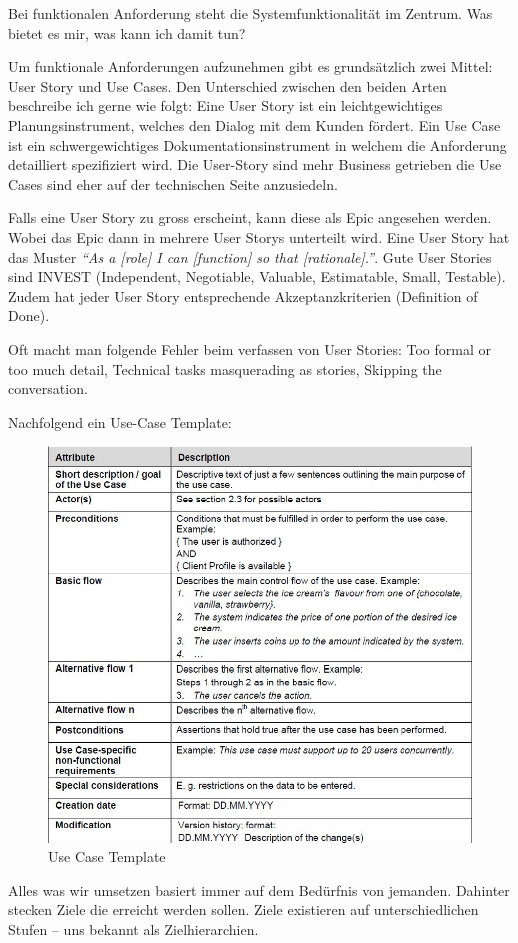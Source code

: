 Bei funktionalen Anforderung steht die Systemfunktionalität im Zentrum. Was bietet es mir, was kann ich damit tun? 

Um funktionale Anforderungen aufzunehmen gibt es grundsätzlich zwei Mittel: User Story und Use Cases. Den Unterschied zwischen den beiden Arten beschreibe ich gerne wie folgt: Eine User Story ist ein leichtgewichtiges Planungsinstrument, welches den Dialog mit dem Kunden fördert. Ein Use Case ist ein schwergewichtiges Dokumentationsinstrument in welchem die Anforderung detailliert spezifiziert wird. Die User-Story sind mehr Business getrieben die Use Cases sind eher auf der technischen Seite anzusiedeln.

Falls eine User Story zu gross erscheint, kann diese als Epic angesehen werden. Wobei das Epic dann in mehrere User Storys unterteilt wird. Eine User Story hat das Muster \emph{“As a [role] I can [function] so that [rationale].”}. Gute User Stories sind INVEST (Independent, Negotiable, Valuable, Estimatable, Small, Testable). Zudem hat jeder User Story entsprechende Akzeptanzkriterien (Definition of Done).

Oft macht man folgende Fehler beim verfassen von User Stories: Too formal or too much detail, Technical tasks masquerading as stories, Skipping the conversation.

Nachfolgend ein Use-Case Template:

\begin{figure}[h!]
\centering
\includegraphics[width=0.7\linewidth]{fig/use-case-template}
\caption{Use Case Template}
\label{fig:use-case-template}
\end{figure}

\newpage
Alles was wir umsetzen basiert immer auf dem Bedürfnis von jemanden. Dahinter stecken Ziele die erreicht werden sollen. Ziele existieren auf unterschiedlichen Stufen -- uns bekannt als Zielhierarchien. 


